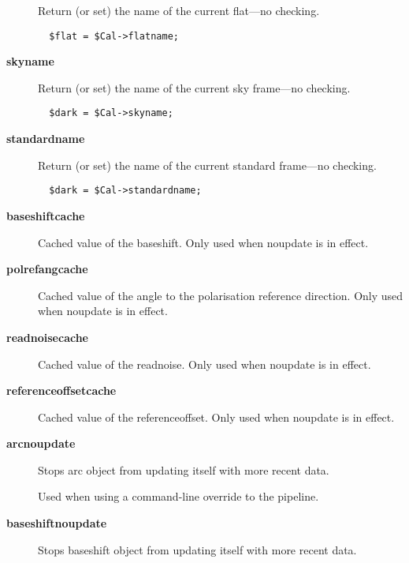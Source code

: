 \begin{description}
Return (or set) the name of the current flat---no checking.

\begin{verbatim}
  $flat = $Cal->flatname;
\end{verbatim}

\item[\textbf{skyname}] \mbox{}

Return (or set) the name of the current sky frame---no checking.

\begin{verbatim}
  $dark = $Cal->skyname;
\end{verbatim}

\item[\textbf{standardname}] \mbox{}

Return (or set) the name of the current standard frame---no checking.

\begin{verbatim}
  $dark = $Cal->standardname;
\end{verbatim}

\item[\textbf{baseshiftcache}] \mbox{}

Cached value of the baseshift.  Only used when noupdate is in effect.


\item[\textbf{polrefangcache}] \mbox{}

Cached value of the angle to the polarisation reference direction.  Only
used when noupdate is in effect.


\item[\textbf{readnoisecache}] \mbox{}

Cached value of the readnoise.  Only used when noupdate is in effect.


\item[\textbf{referenceoffsetcache}] \mbox{}

Cached value of the referenceoffset.  Only used when noupdate is in effect.


\item[\textbf{arcnoupdate}] \mbox{}

Stops arc object from updating itself with more recent data.



Used when using a command-line override to the pipeline.


\item[\textbf{baseshiftnoupdate}] \mbox{}

Stops baseshift object from updating itself with more recent data.




\end{description}
